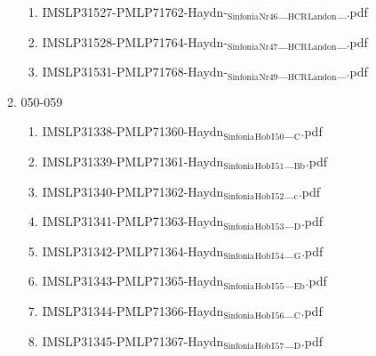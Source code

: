 \documentclass[11pt]{article}
\begin{document}
\begin{enumerate}
\begin{enumerate}
\begin{enumerate}
\item IMSLP31527-PMLP71762-Haydn-$_{\text{Sinfonia}}$$_{\text{Nr46}}$\_$_{\text{HCR}}$$_{\text{Landon}}$\_.pdf
\label{sec-1-1-1-1-44-38-7-5-7}

\item IMSLP31528-PMLP71764-Haydn-$_{\text{Sinfonia}}$$_{\text{Nr47}}$\_$_{\text{HCR}}$$_{\text{Landon}}$\_.pdf
\label{sec-1-1-1-1-44-38-7-5-8}

\item IMSLP31531-PMLP71768-Haydn-$_{\text{Sinfonia}}$$_{\text{Nr49}}$\_$_{\text{HCR}}$$_{\text{Landon}}$\_.pdf
\label{sec-1-1-1-1-44-38-7-5-9}
\end{enumerate}

\item 050-059
\label{sec-1-1-1-1-44-38-7-6}
\begin{enumerate}
\item IMSLP31338-PMLP71360-Haydn$_{\text{Sinfonia}}$$_{\text{Hob}}$$_{\text{I}}$$_{\text{50}}$\_$_{\text{C}}$.pdf
\label{sec-1-1-1-1-44-38-7-6-1}

\item IMSLP31339-PMLP71361-Haydn$_{\text{Sinfonia}}$$_{\text{Hob}}$$_{\text{I}}$$_{\text{51}}$\_$_{\text{Bb}}$.pdf
\label{sec-1-1-1-1-44-38-7-6-2}

\item IMSLP31340-PMLP71362-Haydn$_{\text{Sinfonia}}$$_{\text{Hob}}$$_{\text{I}}$$_{\text{52}}$\_$_{\text{c}}$.pdf
\label{sec-1-1-1-1-44-38-7-6-3}

\item IMSLP31341-PMLP71363-Haydn$_{\text{Sinfonia}}$$_{\text{Hob}}$$_{\text{I}}$$_{\text{53}}$\_$_{\text{D}}$.pdf
\label{sec-1-1-1-1-44-38-7-6-4}

\item IMSLP31342-PMLP71364-Haydn$_{\text{Sinfonia}}$$_{\text{Hob}}$$_{\text{I}}$$_{\text{54}}$\_$_{\text{G}}$.pdf
\label{sec-1-1-1-1-44-38-7-6-5}

\item IMSLP31343-PMLP71365-Haydn$_{\text{Sinfonia}}$$_{\text{Hob}}$$_{\text{I}}$$_{\text{55}}$\_$_{\text{Eb}}$.pdf
\label{sec-1-1-1-1-44-38-7-6-6}

\item IMSLP31344-PMLP71366-Haydn$_{\text{Sinfonia}}$$_{\text{Hob}}$$_{\text{I}}$$_{\text{56}}$\_$_{\text{C}}$.pdf
\label{sec-1-1-1-1-44-38-7-6-7}

\item IMSLP31345-PMLP71367-Haydn$_{\text{Sinfonia}}$$_{\text{Hob}}$$_{\text{I}}$$_{\text{57}}$\_$_{\text{D}}$.pdf
\label{sec-1-1-1-1-44-38-7-6-8}


\end{enumerate}
\end{enumerate}
\end{enumerate}
\end{document}
